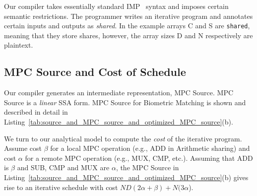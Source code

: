 Our compiler takes essentially standard IMP~\cite{Nipkow2014}
syntax and imposes certain semantic restrictions. %
The programmer writes an iterative program and annotates certain inputs
and outputs as \emph{shared}. In the example arrays {\sf C} and {\sf S}
are \texttt{shared}, meaning that they store shares, however, the array sizes {\sf D} and
{\sf N} respectively are plaintext. 

\subsection{MPC Source and Cost of Schedule}

Our compiler generates an intermediate representation, MPC Source. 
MPC Source is a \emph{linear} SSA form.
MPC Source for Biometric Matching is shown and described in detail in
Listing~\ref{tab:source_and_MPC_source_and_optimized_MPC_source}(b). 


\begin{comment}
First, MPC Source is an SSA form.
Second, it is linear. The conditional in lines 13-14 in IMP Source turns into the linear code in lines 12-16 in MPC Source.
The test turns into the CMP operation {\sf t = CMP(sum!3,min\_sum!2)}, followed by the
true-branch sequence, followed by the MUX operations. The first MUX operation selects the value
of {\sf min\_sum}: if {\sf t} is true, then {\sf min\_sum} gets the value of the second multiplexer
argument,  {\sf min\_sum!3}, otherwise it takes the value of the third argument, {\sf min\_sum!2}.
Third, MPC Source is a special form of SSA. The SSA $\phi$-nodes at the if-then-else (lines 13-15) turn into
MUX operations, while the $\phi$-nodes at for-loops turn into \emph{pseudo} PHI nodes with a straightforward semantics.
\end{comment}

We turn to our analytical model to compute the \emph{cost} of the iterative program. Assume
cost $\beta$ for a local MPC operation (e.g., ADD in Arithmetic sharing) and cost $\alpha$ for a remote
MPC operation (e.g., MUX, CMP, etc.). Assuming that ADD is $\beta$ and SUB, CMP and MUX are $\alpha$, 
the MPC Source in Listing~\ref{tab:source_and_MPC_source_and_optimized_MPC_source}(b) gives 
rise to an iterative schedule with cost $ND(2\alpha+\beta) + N(3\alpha$).

